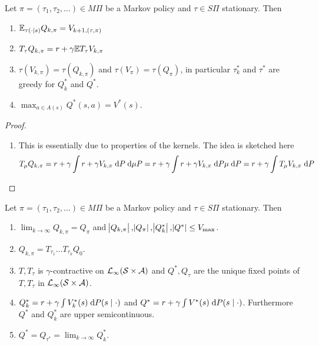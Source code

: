 \begin{prop}
  Let $\pi = (\tau_1, \tau_2, \dots) \in M\Pi$ be a Markov policy
  and $\tau \in S\Pi$ stationary. Then
  \leavevmode
  \begin{enumerate}
    \item $\mathbb{E}_{\tau(\cdot \mid s)} Q_{k, \pi} = V_{k+1, (\tau, \pi)}$
    \item $T_\tau Q_{k, \pi}
      = r + \gamma \mathbb{E} T_\tau V_{k, \pi}$
    \item $\tau(V_{k, \pi}) = \tau(Q_{k, \pi})$ and
      $\tau(V_\pi) = \tau(Q_\pi)$, in particular $\tau^*_k$ and $\tau^*$
      are greedy for $Q^*_k$ and $Q^*$.
    \item $\max_{a \in A(s)} Q^*(s, a) = V^*(s)$.
    \end{enumerate}
  \label{prop:TQ}
\end{prop}
\begin{proof}
  \leavevmode
  \begin{enumerate}
    \item This is essentially due to properties of the kernels. The idea is
      sketched here
      \begin{align*}
	T_\mu Q_{k, \pi} = r + \gamma \int r + \gamma V_{k, \pi}
	\; \mathrm{d} P \; \mathrm{d} \mu P
	= r + \gamma \int r + \gamma V_{k, \pi} \; \mathrm{d} P \mu \; \mathrm{d} P
	= r + \gamma \int T_\mu V_{k, \pi} \; \mathrm{d} P
      \end{align*}
  \end{enumerate}
\end{proof}

\begin{prop}
  Let $\pi = (\tau_1, \tau_2, \dots) \in M\Pi$ be a Markov policy
  and $\tau \in S\Pi$ stationary. Then
  \leavevmode
  \begin{enumerate}
    \item $\lim_{k \to \infty} Q_{k, \pi} = Q_\pi$
      and $\abs{Q_{k, \pi}}, \abs{Q_\pi}, \abs{Q^*_k}, \abs{Q^*} \leq V_{\max}$.
    \item $Q_{k, \pi} = T_{\tau_1} \dots T_{\tau_k} Q_0$.
    \item $T, T_\tau$ is $\gamma$-contractive on
      $\mathcal{L}_\infty(\mathcal{S}\times\mathcal{A})$
      and $Q^*, Q_\tau$ are the unique fixed points of $T, T_\tau$ in
      $\mathcal{L}_\infty(\mathcal{S}\times\mathcal{A})$.
    \item $Q^*_k = r + \gamma \int V^*_k(s) \; \mathrm{d} P(s \mid \cdot)$ and
      $Q^* = r + \gamma \int V^*(s) \; \mathrm{d} P(s \mid \cdot)$.
      Furthermore $Q^*$ and $Q^*_k$ are upper semicontinuous.
    \item $Q^* = Q_{\tau^*} = \lim_{k\to\infty} Q_k^*$.
  \end{enumerate}
\end{prop}

